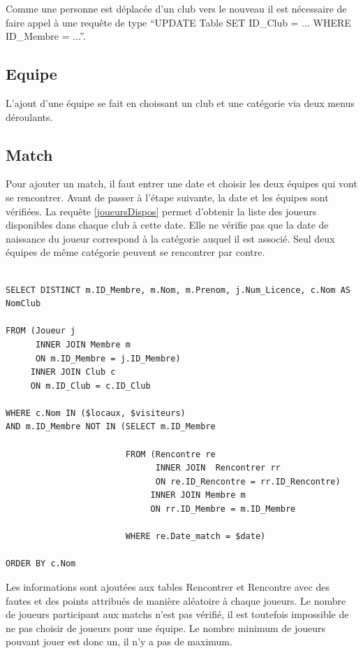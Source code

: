 \documentclass[a4paper»,8pt,french,fleqn]{report}
\begin{document}
Comme une personne est déplacée d'un club vers le nouveau il est nécessaire de faire appel à une requête de type ``UPDATE Table SET ID\_Club = ... WHERE ID\_Membre = ...''.

\subsection{Equipe}
L'ajout d'une équipe se fait en choissant un club et une catégorie via deux menus déroulants.

\subsection{Match}
Pour ajouter un match, il faut entrer une date et choisir les deux équipes qui vont se rencontrer. Avant de passer à l'étape suivante, la date et les équipes sont vérifiées. La requête \ref{joueursDispos} permet d'obtenir la liste des joueurs disponibles dans chaque club à cette date. Elle ne vérifie pas que la date de naissance du joueur correspond à la catégorie auquel il est associé. Seul deux équipes de même catégorie peuvent se rencontrer par contre.

\begin{lstlisting}

SELECT DISTINCT m.ID_Membre, m.Nom, m.Prenom, j.Num_Licence, c.Nom AS NomClub 

FROM (Joueur j 
      INNER JOIN Membre m
      ON m.ID_Membre = j.ID_Membre)
     INNER JOIN Club c
     ON m.ID_Club = c.ID_Club

WHERE c.Nom IN ($locaux, $visiteurs)
AND m.ID_Membre NOT IN (SELECT m.ID_Membre

                        FROM (Rencontre re
                              INNER JOIN  Rencontrer rr
                              ON re.ID_Rencontre = rr.ID_Rencontre)
                             INNER JOIN Membre m
                             ON rr.ID_Membre = m.ID_Membre

                        WHERE re.Date_match = $date)

ORDER BY c.Nom

\end{lstlisting}  

Les informations sont ajoutées aux tables Rencontrer et Rencontre avec des fautes et des points attribués de manière aléatoire à chaque joueurs. Le nombre de joueurs participant aux matchs n'est pas vérifié, il est toutefois impossible de ne pas choisir de joueurs pour une équipe. Le nombre minimum de joueurs pouvant jouer est donc un, il n'y a pas de maximum.
\end{document}
